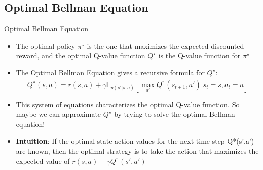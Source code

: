 \subsection{Optimal Bellman Equation}
\begin{frame}{Optimal Bellman Equation}
\begin{itemize}
    \item The optimal policy $\pi^{\star}$ is the one that maximizes the expected discounted reward, and the optimal Q-value function $Q^{\star}$ is the Q-value function for $\pi^{\star}$
    \item The Optimal Bellman Equation gives a recursive formula for $Q^{\star}$:
    $$Q^{\pi}(s,a) =  r(s,a) + \gamma \mathbb{E}_{p(s'|s, a)}\left [\max_{a'} Q^{\pi}(s_{t+1},a') | s_t=s, a_t=a \right ]$$
    \item This system of equations characterizes the optimal Q-value function. So maybe we can approximate $Q^{\star}$  by trying to solve the optimal Bellman equation!
    \item \textbf{Intuition}: If the optimal state-action values for the next time-step Q*(s’,a’) are known, then the optimal strategy is to take the action that maximizes the expected value of $r(s,a) + \gamma Q^{\pi}(s',a')$
    
\end{itemize}
    
\end{frame}